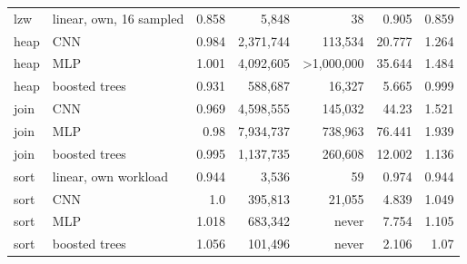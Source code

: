 \begin{tabular}{llrrrrr}
lzw & linear, own, 16 sampled & 0.858 & 5,848 & 38 & 0.905 & 0.859 \\
heap & CNN & 0.984 & 2,371,744 & 113,534 & 20.777 & 1.264 \\
heap & MLP & 1.001 & 4,092,605 & >1,000,000 & 35.644 & 1.484 \\
heap & boosted trees & 0.931 & 588,687 & 16,327 & 5.665 & 0.999 \\
join & CNN & 0.969 & 4,598,555 & 145,032 & 44.23 & 1.521 \\
join & MLP & 0.98 & 7,934,737 & 738,963 & 76.441 & 1.939 \\
join & boosted trees & 0.995 & 1,137,735 & 260,608 & 12.002 & 1.136 \\
sort & linear, own workload & 0.944 & 3,536 & 59 & 0.974 & 0.944 \\
sort & CNN & 1.0 & 395,813 & 21,055 & 4.839 & 1.049 \\
sort & MLP & 1.018 & 683,342 & never & 7.754 & 1.105 \\
sort & boosted trees & 1.056 & 101,496 & never & 2.106 & 1.07 \\
\bottomrule
\end{tabular}
